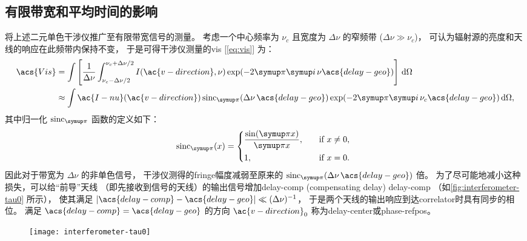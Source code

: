 \subsection{有限带宽和平均时间的影响}

将上述二元单色干涉仪推广至有限带宽信号的测量。
考虑一个中心频率为 $\nu_c$ 且宽度为 $\Delta\nu$ 的窄频带 ($\Delta\nu \gg \nu_c$)，
可认为辐射源的亮度和天线的响应在此频带内保持不变，
于是可得干涉仪测量的\ac{vis} [\autoref{eq:vis}] 为：
\begin{align}
  \acs{Vis}
    & = \int \left[ \frac{1}{\Delta\nu}
        \int_{\nu_c-\Delta\nu/2}^{\nu_c+\Delta\nu/2}
        I(\ac{v-direction}, \nu) \exp (-2\Cpi\Ci\, \nu\acs{delay-geo})
      \right] \,\D{\Omega} \\
    & \approx \int \ac{I-nu}(\ac{v-direction})
      \sinc_{\Cpi} (\Delta\nu\,\acs{delay-geo})
      \exp (-2\Cpi\Ci\, \nu_c\acs{delay-geo}) \,\D{\Omega},
  \label{eq:vis-bw}
\end{align}
其中归一化 $\sinc_{\Cpi}$ 函数的定义如下：
\begin{equation}
  \label{eq:sinc}
  \sinc_{\Cpi}(x) =
    \begin{dcases*}
      \frac{\sin(\Cpi x)}{\Cpi x}, \quad & if $x \neq 0$, \\
      1, \quad & if $x = 0$.
    \end{dcases*}
\end{equation}
因此对于带宽为 $\Delta\nu$ 的非单色信号，
干涉仪测得的\ac{fringe}幅度减弱至原来的
$\sinc_{\Cpi}(\Delta\nu\,\acs{delay-geo})$ 倍。
为了尽可能地减小这种损失，可以给\enquote{前导}天线
（即先接收到信号的天线）的输出信号增加\acl{delay-comp}
(compensating delay) \ac{delay-comp}
（如\autoref{fig:interferometer-tau0} 所示），
使其满足 $|\acs{delay-comp} - \acs{delay-geo}| \ll (\Delta\nu)^{-1}$，
于是两个天线的输出响应到达\ac{correlator}时具有同步的相位。
满足 $\acs{delay-comp} = \acs{delay-geo}$ 的方向 $\ac{v-direction}_0$
称为\acf{delay-center}或\acf{phase-refpos}。

\begin{figure}[htp]
  \centering
  \texttt{[image: interferometer-tau0]}
  \label{fig:interferometer-tau0}
\end{figure}

